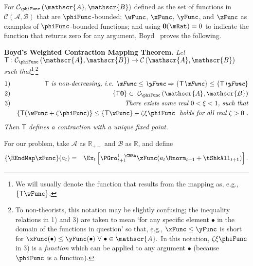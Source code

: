 \documentclass[titlepage]{\econtex}\providecommand{\texname}{BufferStockTheory}%
\begin{document}
For $\mathcal{C}_{\phiFunc }\left( \mathscr{A},\mathscr{B}\right) $
defined as the set of functions in
$\mathcal{C}(\mathscr{A},\mathscr{B})$ that are $\phiFunc$-bounded;
$\wFunc$, $\xFunc$, $\yFunc$, and $\zFunc$ as examples of
$\phiFunc$-bounded functions; and using $\mathbf{0}(\mRat)=0$ to
indicate the function that returns zero for any argument,
Boyd~\citeyearpar{jboyd:weighted} proves the following.

\newcommand{\BoydT}{\mathsf{T}}

\textbf{Boyd's Weighted Contraction Mapping Theorem.} \textit{Let $\BoydT:\mathcal{C}_{\phiFunc }\left( \mathscr{A},\mathscr{B}\right)
\rightarrow \mathcal{C}\left( \mathscr{A},\mathscr{B}\right) $ such
that}\footnote{We will usually denote the function that results from the mapping as, e.g., $\{\BoydT\wFunc\}$.}$^,$\footnote{To non-theorists, this notation may be slightly confusing; the inequality relations in 1) and 3) are taken to mean `for any specific element $\bullet$ in the domain of the functions in question' so that, e.g., $\xFunc \leq \yFunc$ is short for $\xFunc(\bullet) \leq \yFunc(\bullet)~\forall~\bullet\in \mathscr{A}.$  In this notation, $\zeta \xi \phiFunc$ in 3) is a {\it function} which can be applied to any argument $\bullet$ (because $\phiFunc$ is a function).} \nopagebreak
\begin{eqnarray*}
\mbox{1)} &&\BoydT%
\mbox{ {\it is non-decreasing, i.e.\ ${\xFunc} \leq {\yFunc}\Rightarrow
\{\BoydT{\xFunc}\} \leq \{\BoydT{\yFunc}\}$}}   \nonumber \\
\mbox{2)} && \{\BoydT\mathbf{0}\}\in ~ \mathcal{C}_{\phiFunc }\left(\mathscr{A},\mathscr{B}\right)  \notag \\
\mbox{3)}
&& \mbox{\it There exists some real $0 < \xi < 1$, such that} \\
&& \{\BoydT({\wFunc} +\zeta\phiFunc )\} \leq \{\BoydT{\wFunc}\} +\zeta\xi \phiFunc
\mbox{ {\it ~holds for all real $\zeta > 0$} }.
\end{eqnarray*}%
\textit{Then $\BoydT$ defines a contraction with a unique fixed point.}

For our problem, take $\mathscr{A}$ as $\mathbb{R}_{++}$ and $\mathscr{B}$
as $\mathbb{R}$, and define
\begin{eqnarray*}
  \{\EEndMap \zFunc\}(a_{t}) & = & \Ex_{t}\left[\PGro^{1-\CRRA}_{t+1} \zFunc(a_{t} \Rnorm_{t+1} + \tShkAll_{t+1})\right].
\end{eqnarray*}
\end{document}
